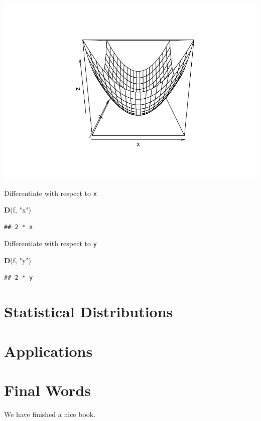 \documentclass[]{book}
\newenvironment{Shaded}{\begin{snugshade}}{\end{snugshade}}
\newcommand{\KeywordTok}[1]{\textcolor[rgb]{0.13,0.29,0.53}{\textbf{#1}}}
\newcommand{\NormalTok}[1]{#1}
\newcommand{\StringTok}[1]{\textcolor[rgb]{0.31,0.60,0.02}{#1}}
\begin{document}
\includegraphics{bookdown-demo_files/figure-latex/unnamed-chunk-11-1.pdf}

Differentiate with respect to \texttt{x}

\begin{Shaded}
\begin{Highlighting}[]
\KeywordTok{D}\NormalTok{(f, }\StringTok{"x"}\NormalTok{)}
\end{Highlighting}
\end{Shaded}

\begin{verbatim}
## 2 * x
\end{verbatim}

Differentiate with respect to \texttt{y}

\begin{Shaded}
\begin{Highlighting}[]
\KeywordTok{D}\NormalTok{(f, }\StringTok{"y"}\NormalTok{)}
\end{Highlighting}
\end{Shaded}

\begin{verbatim}
## 2 * y
\end{verbatim}

\hypertarget{statistical-distributions}{%
\chapter{Statistical Distributions}\label{statistical-distributions}}

\hypertarget{applications}{%
\chapter{Applications}\label{applications}}

\hypertarget{final-words}{%
\chapter{Final Words}\label{final-words}}

We have finished a nice book.


\end{document}
